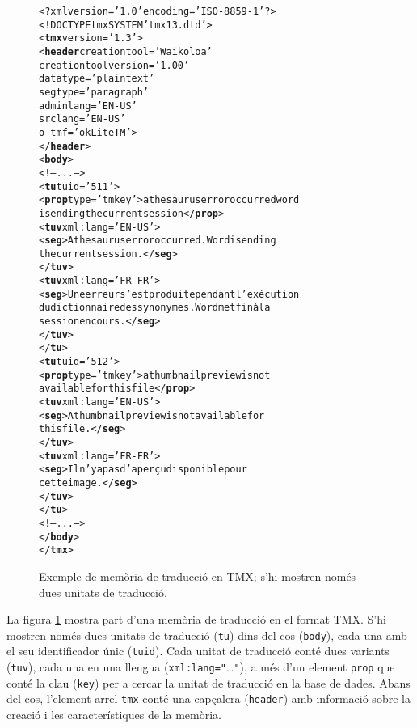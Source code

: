 \begin{figure}
\begin{center}
\begin{alltt}
<?xml version='1.0' encoding='ISO-8859-1' ?>
<!DOCTYPE tmx SYSTEM 'tmx13.dtd'>
<\textbf{tmx} version='1.3'>
 <\textbf{header} creationtool='Waikoloa' 
                  creationtoolversion='1.00'
                  datatype='plaintext'
                  segtype='paragraph'
                  adminlang='EN-US'
                  srclang='EN-US'
                  o-tmf='okLiteTM'>
 </\textbf{header}>
 <\textbf{body}>
 <!-- ... -->
   <\textbf{tu} tuid='511'>
   <\textbf{prop} type='tmkey'>a thesaurus error occurred word 
   is ending the current session</\textbf{prop}>
   <\textbf{tuv} xml:lang='EN-US'> 
    <\textbf{seg}>A thesaurus error occurred. Word is ending 
    the current session.</\textbf{seg}>
   </\textbf{tuv}>
   <\textbf{tuv} xml:lang='FR-FR'> 
    <\textbf{seg}>Une erreur s'est produite pendant l'exécution 
    du dictionnaire des synonymes. Word met fin à la 
    session en cours.</\textbf{seg}>
   </\textbf{tuv}>
  </\textbf{tu}>
  <\textbf{tu} tuid='512'>
   <\textbf{prop} type='tmkey'>a thumbnail preview is not 
    available for this file</\textbf{prop}>
   <\textbf{tuv} xml:lang='EN-US'>
    <\textbf{seg}>A thumbnail preview is not available for
         this file.</\textbf{seg}>
   </\textbf{tuv}>
   <\textbf{tuv} xml:lang='FR-FR'>
    <\textbf{seg}>Il n'y a pas d'aperçu disponible pour
         cette image.</\textbf{seg}>
   </\textbf{tuv}>
  </\textbf{tu}>
  <!-- ... -->
</\textbf{body}>
</\textbf{tmx}>
\end{alltt}
\end{center}
\caption{Exemple de memòria de traducció en TMX; s'hi mostren només
  dues unitats de traducció.}
\label{fg:tmx}
\end{figure}

La figura \ref{fg:tmx} mostra part d'una memòria de traducció en el
format TMX. S'hi mostren només dues unitats de traducció (\texttt{tu})
dins del cos (\texttt{body}), cada una amb el seu identificador únic
(\texttt{tuid}). Cada unitat de traducció conté dues variants
(\texttt{tuv}), cada una en una llengua
(\texttt{xml:lang="}\ldots\texttt{"}), a més d'un element
\texttt{prop} que conté la clau (\texttt{key}) per a cercar la unitat
de traducció en la base de dades. Abans del cos, l'element arrel
\texttt{tmx} conté una capçalera (\texttt{header}) amb informació
sobre la creació i les característiques de la memòria.


